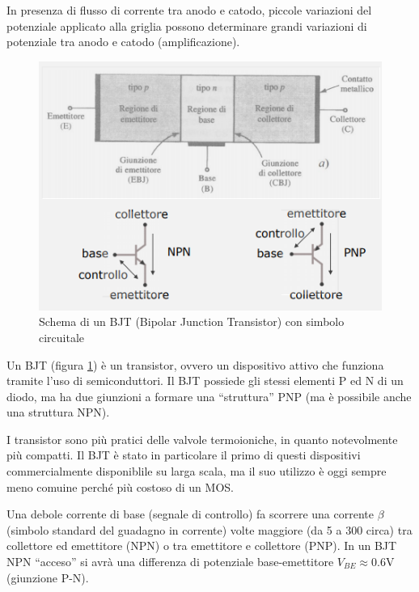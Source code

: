 \documentclass{article}
\begin{document}
\vspace{3mm}

In presenza di flusso di corrente tra anodo e catodo, piccole variazioni del potenziale applicato alla griglia possono determinare grandi variazioni di potenziale tra anodo e catodo (amplificazione).

\begin{figure}[h]
  \centering
  \includegraphics[scale=0.7]{IM_BJT}
  \caption{Schema di un BJT (Bipolar Junction Transistor) con simbolo circuitale}
  \label{Schema_BJT}
\end{figure}

Un BJT (figura \ref{Schema_BJT}) è un transistor, ovvero un dispositivo attivo che funziona tramite l'uso di semiconduttori. Il BJT possiede gli stessi elementi P ed N di un diodo, ma ha due giunzioni a formare una ``struttura'' PNP (ma è possibile anche una struttura NPN).

\vspace{3mm}

I transistor sono più pratici delle valvole termoioniche, in quanto notevolmente più compatti. Il BJT è stato in particolare il primo di questi dispositivi commercialmente disponiblile su larga scala, ma il suo utilizzo è oggi sempre meno comuine perché più costoso di un MOS.
 
\vspace{3mm}

Una debole corrente di base (segnale di controllo) fa scorrere una corrente $\beta$ (simbolo standard del guadagno in corrente) volte maggiore (da 5 a 300 circa) tra collettore ed emettitore (NPN) o tra emettitore e collettore (PNP). In un BJT NPN ``acceso'' si avrà una differenza di potenziale base-emettitore $V_{BE} \approx 0.6$V (giunzione P-N).
\end{document}
